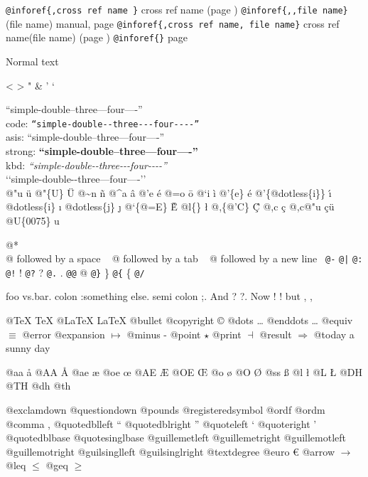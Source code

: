 \documentclass{book}
\begin{document}
\texttt{@inforef\{,cross ref name \}} cross ref name (page \pageref{anchor:})
\texttt{@inforef\{,,file name\}} (file name) manual, page \pageref{anchor:}
\texttt{@inforef\{,cross ref name, file name\}} cross ref name(file name) (page \pageref{anchor:})
\texttt{@inforef\{\}} page \pageref{anchor:}


Normal text


<
>
"
\&
'
`


``simple-double--three---four----''\leavevmode{}\\
code: \texttt{``simple-double{-}{-}three{-}{-}{-}four{-}{-}{-}-''} \leavevmode{}\\
asis: ``simple-double--three---four----'' \leavevmode{}\\
strong: \textbf{``simple-double--three---four----''} \leavevmode{}\\
kbd: {\ttfamily\textsl{``simple-double{-}{-}three{-}{-}{-}four{-}{-}{-}-''}} \leavevmode{}\\


`\hbox{}`simple-double-\hbox{}-three---four----'\hbox{}'\leavevmode{}\\


@"u \"{u} 
@"\{U\} \"{U} 
@\~{}n \~{n}
@\^{}a \^{a}
@'e \'{e}
@=o \={o}
@`i \`{i}
@'\{e\} \'{e}
@'\{@dotless\{i\}\} \'{\i{}} 
@dotless\{i\} \i{}
@dotless\{j\} \j{}
@`\{@=E\} \`{\={E}} 
@l\{\} \l{}
@,\{@'C\} \c{\'{C}}
@,c \c{c}
@,c@"u \c{c}\"{u} \leavevmode{}\\


@U\{0075\} u


@* \leavevmode{}\\
@ followed by a space
\ {}
@ followed by a tab
\ {}
@ followed by a new line
\ {}\texttt{@-} \-{}
\texttt{@|} 
\texttt{@:} \@
\texttt{@!} \@!
\texttt{@?} \@?
\texttt{@.} \@.
\texttt{@@} @
\texttt{@\}} \}
\texttt{@\{} \{
\texttt{@/} 


foo vs.\@ bar. 
colon :\@And something else.
semi colon ;\@.
And ? ?\@.
Now ! !\@@
but , ,\@


@TeX \TeX{}
@LaTeX \LaTeX{}
@bullet \textbullet{}
@copyright \copyright{}
@dots \dots{}\@
@enddots \dots{}
@equiv $\equiv{}$
@error 
@expansion $\mapsto{}$
@minus -
@point $\star{}$
@print $\dashv{}$
@result $\Rightarrow{}$
@today a sunny day


@aa \aa{}
@AA \AA{}
@ae \ae{}
@oe \oe{}
@AE \AE{}
@OE \OE{}
@o \o{}
@O \O{}
@ss \ss{}
@l \l{}
@L \L{}
@DH \DH{}
@TH \TH{}
@dh \dh{}
@th \th{}


@exclamdown \textexclamdown{}
@questiondown \textquestiondown{}
@pounds \textsterling{}
@registeredsymbol \circledR{}
@ordf \textordfeminine{}
@ordm \textordmasculine{}
@comma ,
@quotedblleft \textquotedblleft{}
@quotedblright \textquotedblright{}
@quoteleft \textquoteleft{}
@quoteright \textquoteright{}
@quotedblbase \quotedblbase{}
@quotesinglbase \quotesinglbase{}
@guillemetleft \guillemotleft{}
@guillemetright \guillemotright{}
@guillemotleft \guillemotleft{}
@guillemotright \guillemotright{}
@guilsinglleft \guilsinglleft{}
@guilsinglright \guilsinglright{}
@textdegree \textdegree{}
@euro \euro{}
@arrow $\rightarrow{}$
@leq $\leq{}$
@geq $\geq{}$
\end{document}
